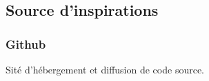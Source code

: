 \subsection{Source d'inspirations}

\begin{frame}
  \frametitle{Github}
  Sité d'hébergement et diffusion de code source.
\end{frame}
